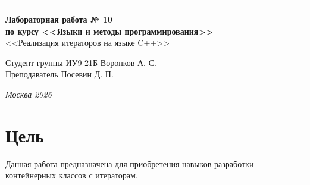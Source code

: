 \documentclass[a4paper, 14pt]{extarticle}
\begin{document}
\begin{titlepage}
\vspace*{-16pt}
\hspace{30pt}\rule{0.866\textwidth}{0.4pt}
  
\vspace{11em}

\begin{center}
\Large {\bf Лабораторная работа № 10} \\ 
\large {\bf по курсу <<Языки и методы программирования>>} \\ 
\large <<Реализация итераторов на языке C++>>
\end{center}\normalsize

\vspace{8em}


\begin{flushright}
  {Студент группы ИУ9-21Б Воронков А. С.\hspace*{15pt} \\
  \vspace{2ex}
  Преподаватель Посевин Д. П.\hspace*{15pt}}
\end{flushright}

\bigskip

\vfill
 

\begin{center}
\textsl{Москва 2026}
\end{center}
\end{titlepage}

\renewcommand{\ttdefault}{pcr}

\setlength{\tabcolsep}{3pt}
\newpage
\setcounter{page}{2}

\section{Цель}\label{Sect::task}
\par 
Данная работа предназначена для приобретения навыков разработки контейнерных классов с итераторам. 

\pagebreak
\end{document}
